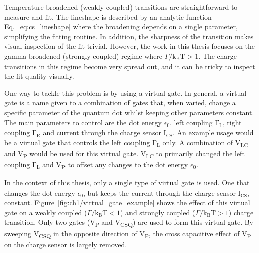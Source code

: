 Temperature broadened (weakly coupled) transitions are straightforward to measure and fit. The lineshape is described by an analytic function Eq.~\ref{eq:cs_lineshape} where the broadening depends on a single parameter, simplifying the fitting routine. In addition, the sharpness of the transition makes visual inspection of the fit trivial. However, the work in this thesis focuses on the gamma broadened (strongly coupled) regime where $\Gamma/\mathrm{k_BT}>1$. The charge transitions in this regime become very spread out, and it can be tricky to inspect the fit quality visually. 

One way to tackle this problem is by using a virtual gate. In general, a virtual gate is a name given to a combination of gates that, when varied, change a specific parameter of the quantum dot whilst keeping other parameters constant. The main parameters to control are the dot energy $\mathrm{\epsilon_0}$, left coupling $\mathrm{\Gamma_L}$, right coupling $\mathrm{\Gamma_R}$ and current through the charge sensor $\mathrm{I_{CS}}$. An example usage would be a virtual gate that controls the left coupling $\mathrm{\Gamma_L}$ only. A combination of V\textsubscript{LC} and V\textsubscript{P} would be used for this virtual gate. V\textsubscript{LC} to primarily changed the left coupling $\mathrm{\Gamma_L}$ and V\textsubscript{P} to offset any changes to the dot energy $\epsilon_0$. 


In the context of this thesis, only a single type of virtual gate is used. One that changes the dot energy $\epsilon_0$, but keeps the current through the charge sensor $\mathrm{I_{CS}}$, constant. Figure~\ref{fig:ch1/virtual_gate_example} shows the effect of this virtual gate on a weakly coupled ($\Gamma/\mathrm{k_BT}<1$) and strongly coupled ($\Gamma/\mathrm{k_BT}>1$) charge transition. Only two gates (V\textsubscript{P} and V\textsubscript{CSQ}) are used to form this virtual gate. By sweeping V\textsubscript{CSQ} in the opposite direction of V\textsubscript{P}, the cross capacitive effect of V\textsubscript{P} on the charge sensor is largely removed. 











